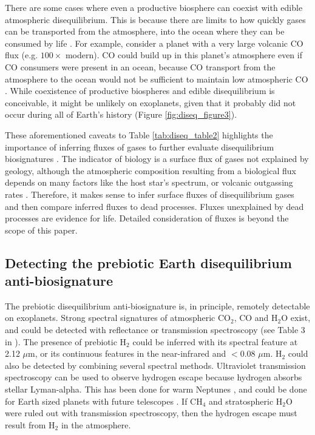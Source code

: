 There are some cases where even a productive biosphere can coexist with edible atmospheric disequilibrium. This is because there are limits to how quickly gases can be transported from the atmosphere, into the ocean where they can be consumed by life \citep{Kharecha_2005}. For example, consider a planet with a very large volcanic CO flux (e.g. $100\times$ modern). CO could build up in this planet's atmosphere even if CO consumers were present in an ocean, because CO transport from the atmosphere to the ocean would not be sufficient to maintain low atmospheric CO \citep{Schwieterman_2019}. While coexistence of productive biospheres and edible disequilibrium is conceivable, it might be unlikely on exoplanets, given that it probably did not occur during all of Earth's history (Figure \ref{fig:diseq_figure3}).

These aforementioned caveats to Table \ref{tab:diseq_table2} highlights the importance of inferring fluxes of gases to further evaluate disequilibrium biosignatures \citep{KrissansenTotton_2018_diseq,Simoncini_2013}. The indicator of biology is a surface flux of gases not explained by geology, although the atmospheric composition resulting from a biological flux depends on many factors like the host star's spectrum, or volcanic outgassing rates \citep{Segura_2005}. Therefore, it makes sense to infer surface fluxes of disequilibrium gases and then compare inferred fluxes to dead processes. Fluxes unexplained by dead processes are evidence for life. Detailed consideration of fluxes is beyond the scope of this paper.

\subsection{Detecting the prebiotic Earth disequilibrium anti-biosignature}

The prebiotic disequilibrium anti-biosignature is, in principle, remotely detectable on exoplanets. Strong spectral signatures of atmospheric CO$_2$, CO and H$_2$O exist, and could be detected with reflectance or transmission spectroscopy (see Table 3 in \citet{Catling_2018}). The presence of prebiotic H$_2$ could be inferred with its spectral feature at 2.12 $\mu$m, or its continuous features in the near-infrared and $< 0.08$ $\mu$m. H$_2$ could also be detected by combining several spectral methods. Ultraviolet transmission spectroscopy can be used to observe hydrogen escape because hydrogen absorbs stellar Lyman-alpha. This has been done for warm Neptunes \citep{Ehrenreich_2015}, and could be done for Earth sized planets with future telescopes \citep{Fujii_2018}. If CH$_4$ and stratospheric H$_2$O were ruled out with transmission spectroscopy, then the hydrogen escape must result from H$_2$ in the atmosphere. 

